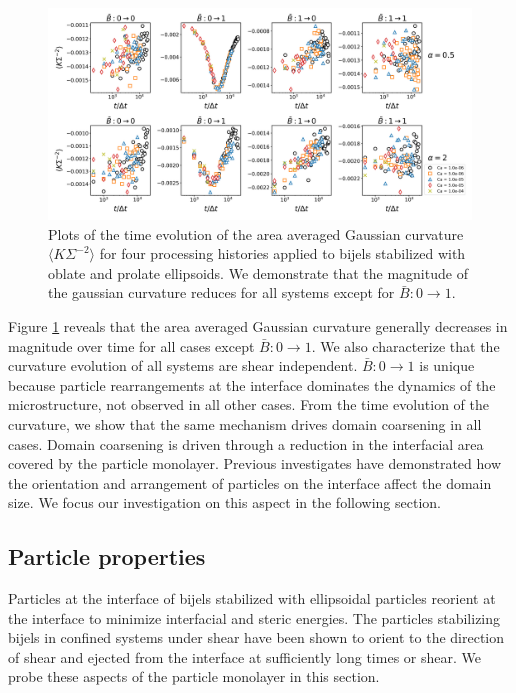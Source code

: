\begin{figure} 
    \centering 
    \includegraphics[scale=0.3]{../figures/results/paper3/gaussian-time_compare.png} 
    \caption{Plots of the time evolution of the area averaged Gaussian curvature $\langle K \Sigma^{-2} \rangle$ for four 
             processing histories applied to bijels stabilized with oblate and prolate ellipsoids. We demonstrate that the 
             magnitude of the gaussian curvature reduces for all systems except for $\bar{B}: 0 \to 1$.} 
    \label{fig:gaussian_curvature_time_shear} 
\end{figure}

Figure \ref{fig:gaussian_curvature_time_shear} reveals that the area averaged Gaussian curvature generally decreases in magnitude over time for all cases except 
$\bar{B}: 0 \to 1$. We also characterize that the curvature evolution of all systems are shear independent. $\bar{B}: 0 \to 1$ is
unique because particle rearrangements at the interface dominates the dynamics of the microstructure, not observed in all other
cases. From the time evolution of the curvature, we show that the same mechanism drives domain coarsening in all cases. Domain
coarsening is driven through a reduction in the interfacial area covered by the particle monolayer. Previous investigates have 
demonstrated how the orientation and arrangement of particles on the interface affect the domain size. 
\cite{gunther_timescales_2014} We focus our investigation on this aspect in the following section. 

\subsection{Particle properties}

Particles at the interface of bijels stabilized with ellipsoidal particles reorient at the interface to minimize interfacial and
steric energies. \cite{gunther_timescales_2014} The particles stabilizing bijels in confined systems under shear have been shown to
orient to the direction of shear and ejected from the interface at sufficiently long times or shear.\cite{bonaccorso_shear_2020} 
We probe these aspects of the particle monolayer in this section.

